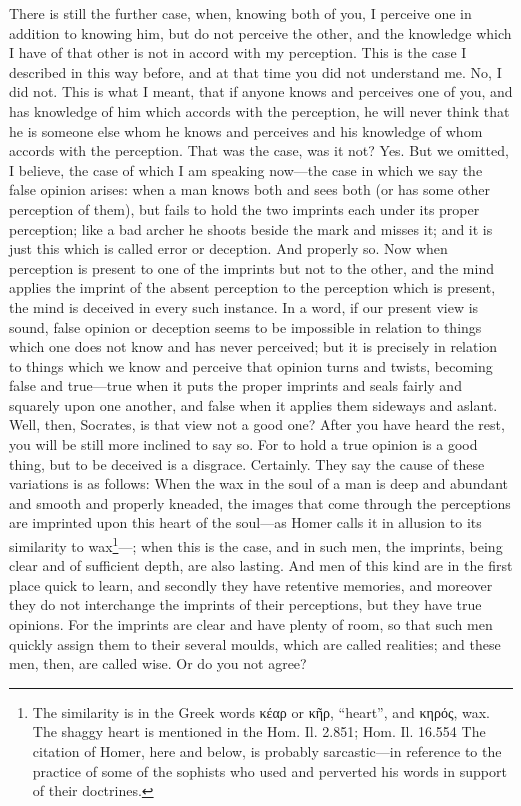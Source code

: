 \documentclass[letterpaper,12pt]{article}
\newcommand{\textgreek}[1]{\begingroup\fontencoding{LGR}\selectfont#1\endgroup}
\newcommand{\stephpag}[1]{\marginnote{\small\itshape\fontfamily{ppl}\selectfont #1}}
\begin{document}
\begin{drama}
\socratesspeaks
There is still the further case, when, knowing both of you, I perceive one in addition to knowing him, but do not perceive the other, and the knowledge which I have of that other is not in accord with my perception. This is the case I described in this way before, and at that time you did not understand me.
\theaetetusspeaks
No, I did not.
\socratesspeaks
This is what I meant, that if anyone knows \stephpag{e} and perceives one of you, and has knowledge of him which accords with the perception, he will never think that he is someone else whom he knows and perceives and his knowledge of whom accords with the perception. That was the case, was it not?
\theaetetusspeaks
Yes.
\socratesspeaks
But we omitted, I believe, the case of which I am speaking now—the case in which we say the false opinion arises: when a man knows both and sees both (or has some other perception of them), \stephpag{194 a} but fails to hold the two imprints each under its proper perception; like a bad archer he shoots beside the mark and misses it; and it is just this which is called error or deception.
\theaetetusspeaks
And properly so.
\socratesspeaks
Now when perception is present to one of the imprints but not to the other, and the mind applies the imprint of the absent perception to the perception which is present, the mind is deceived in every such instance. In a word, if our present view is sound, false opinion or deception seems to be impossible in relation to things which one does not know \stephpag{b} and has never perceived; but it is precisely in relation to things which we know and perceive that opinion turns and twists, becoming false and true—true when it puts the proper imprints and seals fairly and squarely upon one another, and false when it applies them sideways and aslant.
\theaetetusspeaks
Well, then, Socrates, is that view not a good one? \stephpag{c}
\socratesspeaks
After you have heard the rest, you will be still more inclined to say so. For to hold a true opinion is a good thing, but to be deceived is a disgrace.
\theaetetusspeaks
Certainly.
\socratesspeaks
They say the cause of these variations is as follows: When the wax in the soul of a man is deep and abundant and smooth and properly kneaded, the images that come through the perceptions are imprinted upon this heart of the soul—as Homer calls it in allusion to its similarity to wax\footnote{The similarity is in the Greek words \textgreek{κέαρ} or \textgreek{κῆρ}, ``heart'', and \textgreek{κηρός}, wax. The shaggy heart is mentioned in the Hom. Il. 2.851; Hom. Il. 16.554 The citation of Homer, here and below, is probably sarcastic—in reference to the practice of some of the sophists who used and perverted his words in support of their doctrines.}—; when this is the case, and in such men, the imprints, \stephpag{d} being clear and of sufficient depth, are also lasting. And men of this kind are in the first place quick to learn, and secondly they have retentive memories, and moreover they do not interchange the imprints of their perceptions, but they have true opinions. For the imprints are clear and have plenty of room, so that such men quickly assign them to their several moulds, which are called realities; and these men, then, are called wise. Or do you not agree?

\end{drama}
\end{document}
